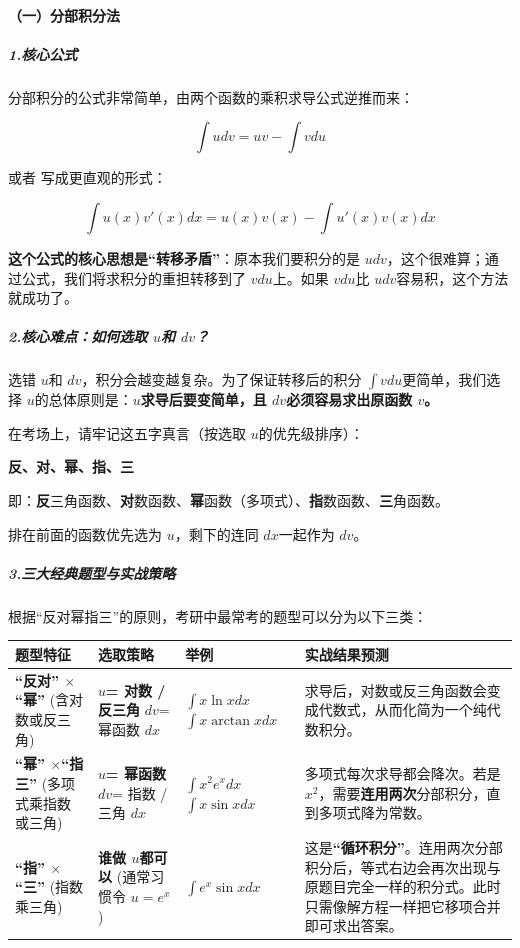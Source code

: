 \documentclass[
]{article}
\newcounter{none} %
\begin{document}
\paragraph{（一）分部积分法}\label{ux4e00uxff09ux5206ux90e8ux79efux5206ux6cd5}

\subparagraph{1.核心公式}\label{1ux6838ux5fc3ux516cux5f0f}

分部积分的公式非常简单，由两个函数的乘积求导公式逆推而来：

\[\int u dv = uv - \int v du\]

或者 写成更直观的形式：

\[\int u(x)v'(x) dx = u(x)v(x) - \int u'(x)v(x) dx\]

\textbf{这个公式的核心思想是``转移矛盾''}：原本我们要积分的是
\(u dv\)，这个很难算；通过公式，我们将求积分的重担转移到了
\(v du\)上。如果 \(v du\)比 \(u dv\)容易积，这个方法就成功了。

\subparagraph{\texorpdfstring{2.核心难点：如何选取 \(u\)和
\(dv\)？}{2.核心难点：如何选取 u和 dv？}}\label{2ux6838ux5fc3ux96beux70b9ux5982ux4f55ux9009ux53d6-uxauuxaux548c-uxadvuxa}

选错 \(u\)和 \(dv\)，积分会越变越复杂。为了保证转移后的积分
\(\int v du\)更简单，我们选择
\(u\)的总体原则是：\textbf{\(u\)求导后要变简单，且
\(dv\)必须容易求出原函数 \(v\)。}

在考场上，请牢记这五字真言（按选取 \(u\)的优先级排序）：

\textbf{反、对、幂、指、三}

即：\textbf{反}三角函数、\textbf{对}数函数、\textbf{幂}函数（多项式）、\textbf{指}数函数、\textbf{三}角函数。

排在前面的函数优先选为 \(u\)，剩下的连同 \(dx\)一起作为 \(dv\)。

\subparagraph{3.三大经典题型与实战策略}\label{3ux4e09ux5927ux7ecfux5178ux9898ux578bux4e0eux5b9eux6218ux7b56ux7565}

根据``反对幂指三''的原则，考研中最常考的题型可以分为以下三类：

{\def\LTcaptype{none} %
\begin{longtable}[]{@{}llll@{}}
\toprule\noalign{}
\textbf{题型特征} & \textbf{选取策略} & \textbf{举例} &
\textbf{实战结果预测} \\
\midrule\noalign{}
\endhead
\bottomrule\noalign{}
\endlastfoot
\textbf{``反对'' \(\times\)``幂''} (含对数或反三角) & \textbf{\(u\)=
对数 / 反三角} \(dv\)= 幂函数 \(dx\) & \(\int x \ln x dx\)
\(\int x \arctan x dx\) &
求导后，对数或反三角函数会变成代数式，从而化简为一个纯代数积分。 \\
\textbf{``幂'' \(\times\)``指三''} (多项式乘指数或三角) & \textbf{\(u\)=
幂函数} \(dv\)= 指数 / 三角 \(dx\) & \(\int x^2 e^x dx\)
\(\int x \sin x dx\) & 多项式每次求导都会降次。若是
\(x^2\)，需要\textbf{连用两次}分部积分，直到多项式降为常数。 \\
\textbf{``指'' \(\times\)``三''} (指数乘三角) & \textbf{谁做
\(u\)都可以} (通常习惯令 \(u=e^x\)) & \(\int e^x \sin x dx\) &
这是\textbf{``循环积分''}。连用两次分部积分后，等式右边会再次出现与原题目完全一样的积分式。此时只需像解方程一样把它移项合并即可求出答案。 \\
\end{longtable}
}
\end{document}
